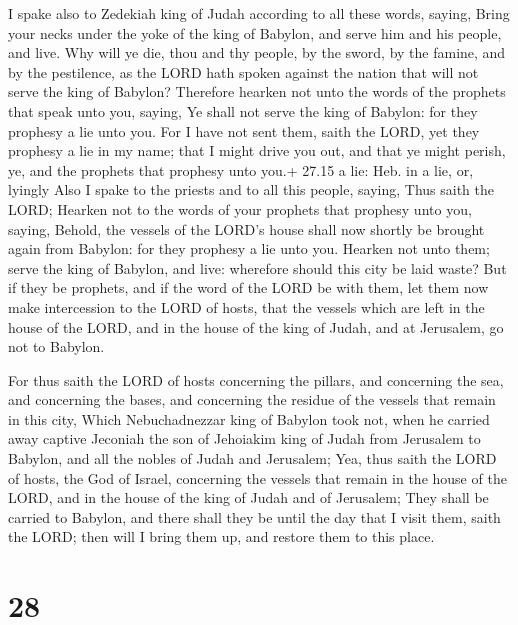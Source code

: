  I spake also to Zedekiah king of Judah according to all
these words, saying, Bring your necks under the yoke of the king of
Babylon, and serve him and his people, and live.  Why will
ye die, thou and thy people, by the sword, by the famine, and by the
pestilence, as the LORD hath spoken against the nation that will not
serve the king of Babylon?  Therefore hearken not unto the
words of the prophets that speak unto you, saying, Ye shall not serve
the king of Babylon: for they prophesy a lie unto you.  For
I have not sent them, saith the LORD, yet they prophesy a lie in my
name; that I might drive you out, and that ye might perish, ye, and the
prophets that prophesy unto you.+ 27.15 a lie: Heb. in a lie, or,
lyingly  Also I spake to the priests and to all this
people, saying, Thus saith the LORD; Hearken not to the words of your
prophets that prophesy unto you, saying, Behold, the vessels of the
LORD's house shall now shortly be brought again from Babylon: for they
prophesy a lie unto you.  Hearken not unto them; serve the
king of Babylon, and live: wherefore should this city be laid waste?
 But if they be prophets, and if the word of the LORD be
with them, let them now make intercession to the LORD of hosts, that the
vessels which are left in the house of the LORD, and in the house of the
king of Judah, and at Jerusalem, go not to Babylon.

 For thus saith the LORD of hosts concerning the pillars,
and concerning the sea, and concerning the bases, and concerning the
residue of the vessels that remain in this city,  Which
Nebuchadnezzar king of Babylon took not, when he carried away captive
Jeconiah the son of Jehoiakim king of Judah from Jerusalem to Babylon,
and all the nobles of Judah and Jerusalem;  Yea, thus saith
the LORD of hosts, the God of Israel, concerning the vessels that remain
in the house of the LORD, and in the house of the king of Judah and of
Jerusalem;  They shall be carried to Babylon, and there
shall they be until the day that I visit them, saith the LORD; then will
I bring them up, and restore them to this place.

\hypertarget{section-27}{%
\section{28}\label{section-27}}

